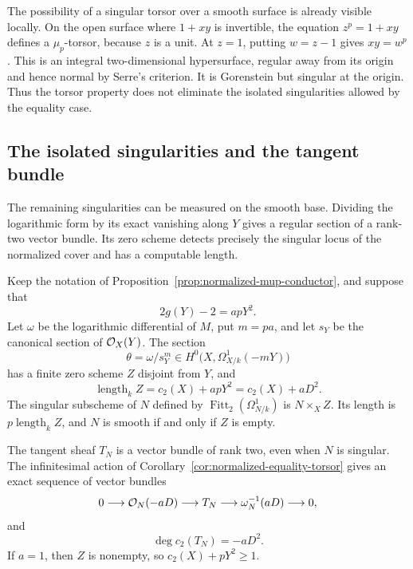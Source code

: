 The possibility of a singular torsor over a smooth surface is already
visible locally. On the open surface where $1+xy$ is invertible,
the equation $z^p=1+xy$ defines a $\mu_p$-torsor, because $z$ is a
unit. At $z=1$, putting $w=z-1$ gives $xy=w^p$. This is an integral
two-dimensional hypersurface, regular away from its origin and hence
normal by Serre's criterion. It is Gorenstein but singular at the
origin. Thus the torsor property does not eliminate the isolated
singularities allowed by the equality case.

\subsection{The isolated singularities and the tangent bundle}
The remaining singularities can be measured on the smooth base. Dividing
the logarithmic form by its exact vanishing along $Y$ gives a regular
section of a rank-two vector bundle. Its zero scheme detects precisely
the singular locus of the normalized cover and has a computable length.

\begin{proposition}\label{prop:normalized-mup-singularity-defect}
Keep the notation of Proposition~\ref{prop:normalized-mup-conductor},
and suppose that
\[
 2g(Y)-2=apY^2.
\]
Let $\omega$ be the logarithmic differential of $M$, put $m=pa$,
and let $s_Y$ be the canonical section of $\mathcal O_X(Y)$.
The section
\[
 \theta=\omega/s_Y^m\in
 H^0\bigl(X,\Omega^1_{X/k}(-mY)\bigr)
\]
has a finite zero scheme $Z$ disjoint from $Y$, and
\begin{equation}\label{eq:normalized-mup-zero-length}
 \operatorname{length}_k Z=c_2(X)+apY^2=c_2(X)+aD^2.
\end{equation}
The singular subscheme of $N$ defined by
$\operatorname{Fitt}_2(\Omega^1_{N/k})$ is $N\times_X Z$.
Its length is $p\operatorname{length}_k Z$, and $N$ is smooth if and
only if $Z$ is empty.

The tangent sheaf $T_N$ is a vector bundle of rank two, even when $N$
is singular. The infinitesimal action of
Corollary~\ref{cor:normalized-equality-torsor} gives an exact sequence of vector bundles
\begin{equation}\label{eq:normalized-mup-tangent-sequence}
 0\longrightarrow\mathcal O_N(-aD)\longrightarrow T_N
 \longrightarrow\omega_N^{-1}(aD)\longrightarrow0,
\end{equation}
and
\begin{equation}\label{eq:normalized-mup-tangent-chern}
 \deg c_2(T_N)=-aD^2.
\end{equation}
If $a=1$, then $Z$ is nonempty, so $c_2(X)+pY^2\geq1$.
\end{proposition}

